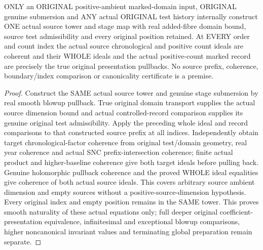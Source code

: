 \begin{theorem}
\label{hir:original-coherent-any-test-positive-count-smooth-producer}
\leanok
ONLY an ORIGINAL positive-ambient marked-domain input, ORIGINAL genuine
submersion and ANY actual ORIGINAL test history internally construct ONE
actual source tower and stage map with real added-fibre domain bound,
source test admissibility and every original position retained. At EVERY
order and count index the actual source chronological and positive count
ideals are coherent and their WHOLE ideals and the actual positive-count
marked record are precisely the true original presentation pullbacks.
No source prefix, coherence, boundary/index comparison or canonicality
certificate is a premise.
\end{theorem}
\begin{proof}
Construct the SAME actual source tower and genuine stage submersion by
real smooth blowup pullback. True original domain transport supplies the
actual source dimension bound and actual controlled-record comparison
supplies its genuine original test admissibility. Apply the preceding
whole ideal and record comparisons to that constructed source prefix at
all indices. Independently obtain target chronological-factor coherence
from original test/domain geometry, real year coherence and actual SNC
prefix-intersection coherence; finite actual product and higher-baseline
coherence give both target ideals before pulling back. Genuine
holomorphic pullback coherence and the proved WHOLE ideal equalities give
coherence of both actual source ideals. This covers arbitrary source
ambient dimension and empty sources without a positive-source-dimension
hypothesis. Every original index and empty position remains in the SAME
tower. This proves smooth naturality of these actual equations only;
full deeper original coefficient-presentation equivalence, infinitesimal
and exceptional blowup comparisons, higher noncanonical invariant values
and terminating global preparation remain separate.
\end{proof}
